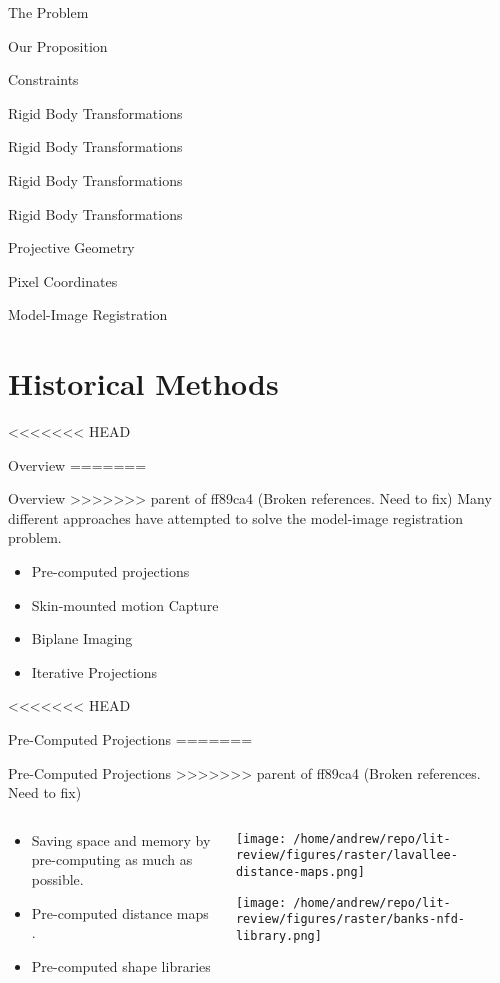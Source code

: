 \documentclass[presentation, aspectratio=1610]{beamer}
\begin{document}
\begin{frame}[label={sec:org51bdd62}]{The Problem}
\begin{frame}[label={sec:org827823c}]{Our Proposition}
\begin{frame}[label={sec:org8655799}]{Constraints}
\begin{frame}[label={sec:orgb624cd0}]{Rigid Body Transformations}
\begin{frame}[label={sec:org66cfa5c}]{Rigid Body Transformations}
\begin{frame}[label={sec:orga8040ec}]{Rigid Body Transformations}
\begin{frame}[label={sec:org2c45bb0}]{Rigid Body Transformations}
\begin{frame}[label={sec:orgc08b8a8}]{Projective Geometry}
\begin{frame}[label={sec:org9004faf}]{Pixel Coordinates}
\begin{frame}[label={sec:orgf5a9f37}]{Model-Image Registration}
\section{Historical Methods}
<<<<<<< HEAD
\label{sec:orgb551ad8}
\begin{frame}[label={sec:orgd132949}]{Overview}
=======
\label{sec:org5da5081}
\begin{frame}[label={sec:org2624207}]{Overview}
>>>>>>> parent of ff89ca4 (Broken references. Need to fix)
Many different approaches have attempted to solve the model-image registration problem.
\begin{itemize}
\item Pre-computed projections
\item Skin-mounted motion Capture
\item Biplane Imaging
\item Iterative Projections
\end{itemize}
\end{frame}
<<<<<<< HEAD
\begin{frame}[label={sec:org3bacc15}]{Pre-Computed Projections}
=======
\begin{frame}[label={sec:org9e7955a}]{Pre-Computed Projections}
>>>>>>> parent of ff89ca4 (Broken references. Need to fix)
\begin{columns}
\begin{column}{0.5\columnwidth}
\begin{itemize}
\item Saving space and memory by pre-computing as much as possible.
\item Pre-computed distance maps \autocites{zuffiModelbasedMethodReconstruction1999}[][]{lavalleeRecoveringPositionOrientation1995}.
\item Pre-computed shape libraries \autocite{banksAccurateMeasurementThreedimensional1996}
\end{itemize}
\end{column}
\begin{column}{0.6\columnwidth}
\begin{center}
\texttt{[image: /home/andrew/repo/lit-review/figures/raster/lavallee-distance-maps.png]}
\end{center}
\begin{center}
\texttt{[image: /home/andrew/repo/lit-review/figures/raster/banks-nfd-library.png]}
\end{center}
\end{column}
\end{columns}
\end{frame}

\end{frame}
\end{frame}
\end{frame}
\end{frame}
\end{frame}
\end{frame}
\end{frame}
\end{frame}
\end{frame}
\end{frame}
\end{frame}
\end{frame}
\end{document}

